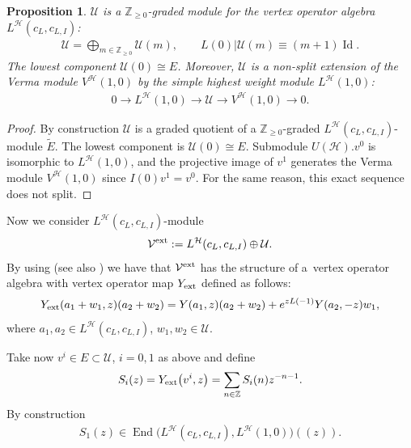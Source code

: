 \documentclass[pdftex]{sigma}
\numberwithin{equation}{section}
\newtheorem{Proposition}[Theorem]{Proposition}
 { \theoremstyle{definition}
\newtheorem{Example}[Theorem]{Example}
\newtheorem{Remark}[Theorem]{Remark} }
\newcommand{\Zp}{{\mathbb Z}_{\geq 0} }
\newcommand{\Z}{\mathbb Z}
\newcommand{\HVir}{\mathcal H}
\begin{document}
\begin{Proposition}
$\mathcal U$ is a $\Zp$-graded module for the vertex operator algebra $L^{\HVir} (c_L, c_{L,I} )$:
\begin{gather*}
\mathcal U = \bigoplus _{m \in {\Zp} } \mathcal U (m), \qquad L(0) \vert \mathcal U(m) \equiv (m+1) \operatorname{Id}.
\end{gather*}
The lowest component $\mathcal U (0) \cong E$. Moreover, $\mathcal U$ is a non-split extension of the Verma module $V^{\HVir} (1,0)$ by the simple highest weight module $L^{\HVir} (1,0)$:
 \begin{gather*}
 0 \rightarrow L^{\HVir} (1,0) \rightarrow \mathcal U \rightarrow V^{\HVir} (1,0 ) \rightarrow 0.
 \end{gather*}
 \end{Proposition}
 \begin{proof}
By construction $\mathcal U $ is a graded quotient of a $\Z_{\ge 0}$-graded $L^{\HVir}(c_L, c_{L,I})$-module $\widetilde E$. The lowest component is $\mathcal U (0) \cong E$. Submodule $U(\HVir).v^0$ is isomorphic to $L^{\HVir}(1,0)$, and the projective image of $v^1$ generates the Verma module $V^{\HVir}(1,0)$ since $I(0)v^1=v^0$. For the same reason, this exact sequence does not split.
\end{proof}

Now we consider $L^{\HVir}(c_L, c_{L,I} )$-module
\begin{gather*}
\mathcal V^{\rm ext}:= L^{\HVir}(c_L, c_{L,I} ) \oplus \mathcal U.
\end{gather*}
By using \cite[Theorem 4.8.1]{LL} (see also \cite{AdM-selecta,Li1}) we have that $ \mathcal V^{\rm ext}$ has the structure of a~vertex operator algebra with vertex operator map $Y_{\rm ext}$ def\/ined as follows:{\samepage
\begin{gather*}
Y_{\rm ext} ( a_1 + w_1 , z ) (a_2 + w_2) = Y(a_1, z) (a_2+w_2) + e^{z L(-1)} Y (a_2 ,-z ) w_1,
\end{gather*}
where $a_1, a_2 \in L^{\HVir}(c_L, c_{L,I} )$, $ w_1, w_2 \in \mathcal U$.}

Take now $v^ i \in E \subset \mathcal U$, $i=0,1$ as above and def\/ine
\begin{gather*}
S_i (z) = Y_{\rm ext} \big(v^i, z\big) = \sum _{n \in \Z} S_i (n) z^{-n-1}.
\end{gather*}
By construction
\begin{gather*}
S_1 (z) \in \operatorname{End} \big( L^{\HVir} (c_L,c_{L,I}), L^{\HVir}(1,0) \big) ((z)).
\end{gather*}
\end{document}
